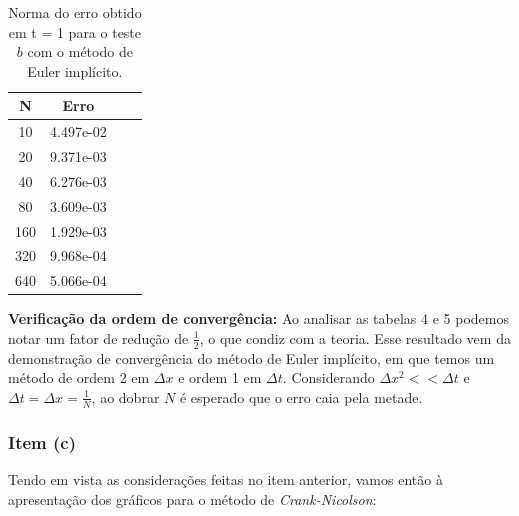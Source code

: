 \documentclass[a4paper, 12pt]{article}
\begin{document}
\begin{table}[!h]
    \centering
    \begin{tabular}{|c|c|c|c|}
    \hline                               %
    N & Erro \\
    \hline
    10  & 4.497e-02  \\
    20  & 9.371e-03  \\
    40  & 6.276e-03  \\
    80  & 3.609e-03  \\
    160 & 1.929e-03  \\
    320 & 9.968e-04  \\
    640 & 5.066e-04  \\
    \hline
    \end{tabular}
    \caption{Norma do erro obtido em t = 1 para o teste $b$ com o método de Euler implícito.}
\end{table}

\textbf{Verificação da ordem de convergência:} Ao analisar as tabelas 4 e 5 podemos notar um fator de redução de $\frac{1}{2}$, o que condiz com a teoria. Esse resultado vem da demonstração de convergência do método de Euler implícito, em que temos um método de ordem 2 em $\Delta x$ e ordem 1 em $\Delta t$. Considerando $\Delta x^2 << \Delta t$ e $\Delta t = \Delta x = \frac{1}{N}$, ao dobrar $N$ é esperado que o erro caia pela metade. 

\subsubsection{Item (c)}

Tendo em vista as considerações feitas no item anterior, vamos então à apresentação dos gráficos para o método de \textit{Crank-Nicolson}:
\end{document}
